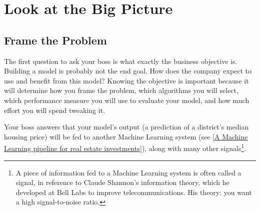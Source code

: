 \section{Look at the Big Picture}
\subsection{Frame the Problem}
The first question to ask your boss is what exactly the business objective is. Building a
model is probably not the end goal. How does the company expect to use and benefit
from this model? Knowing the objective is important because it will determine how
you frame the problem, which algorithms you will select, which performance measure you will use to evaluate your model, and how much effort you will spend tweaking it.

Your boss answers that your model's output (a prediction of a district's median housing price) will be fed to another Machine Learning system (see \autoref{A Machine Learning pipeline for real estate investments}), along
with many other signals\footnote{A piece of information fed to a Machine Learning system is often called a signal, in reference to Claude Shannon's information theory, which he developed at Bell Labs to improve telecommunications. His theory: you
want a high signal-to-noise ratio.}.

